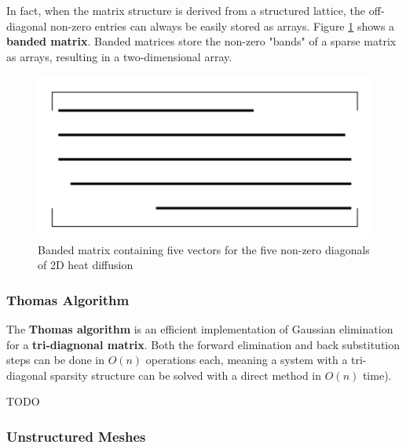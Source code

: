 \documentclass{article}
\begin{document}
In fact, when the matrix structure is derived from a structured lattice, the off-diagonal non-zero entries can always be easily stored as arrays. Figure \ref{fig:banded-matrix} shows a \textbf{banded matrix}. Banded matrices store the non-zero "bands" of a sparse matrix as arrays, resulting in a two-dimensional array.

\begin{figure}
	\centering
	\includegraphics[scale=0.4]{figures/banded-matrix.png}
	\caption{Banded matrix containing five vectors for the five non-zero diagonals of 2D heat diffusion}
	\label{fig:banded-matrix}
\end{figure}

\subsubsection{Thomas Algorithm}

The \textbf{Thomas algorithm} is an efficient implementation of Gaussian elimination for a \textbf{tri-diagnonal matrix}. Both the forward elimination and back substitution steps can be done in $O(n)$ operations each, meaning a system with a tri-diagonal sparsity structure can be solved with a direct method in $O(n)$ time).

TODO

\subsubsection{Unstructured Meshes}
\end{document}
